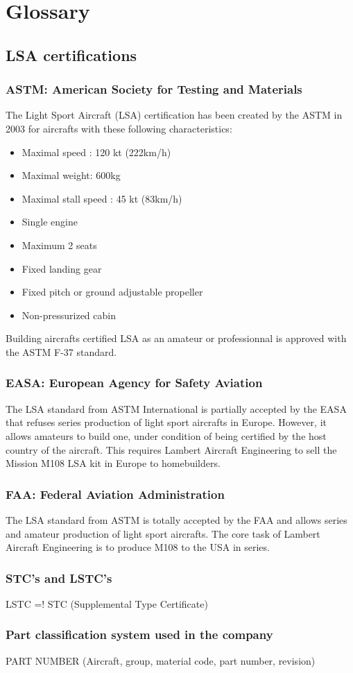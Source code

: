 \documentclass[11pt,a4paper]{article}
\begin{document}
\newpage

\section{Glossary} 
\subsection{LSA certifications}
\subsubsection{ASTM: American Society for Testing and Materials}
The Light Sport Aircraft (LSA) certification has been created by the ASTM in 2003 for aircrafts with these following characteristics:
\begin{itemize}
\item Maximal speed : 120 kt (222km/h)
\item Maximal weight: 600kg
\item Maximal stall speed : 45 kt (83km/h)
\item Single engine
\item Maximum 2 seats
\item Fixed landing gear
\item Fixed pitch or ground adjustable propeller
\item Non-pressurized cabin
\end{itemize}

\bigskip

Building aircrafts certified LSA as an amateur or professionnal is approved with the ASTM F-37 standard.

\subsubsection{EASA: European Agency for Safety Aviation}
The LSA standard from ASTM International is partially accepted by the EASA that refuses series production of light sport aircrafts in Europe. However, it allows amateurs to build one, under condition of being certified by the host country of the aircraft. This requires Lambert Aircraft Engineering to sell the Mission M108 LSA kit in Europe to homebuilders.

\subsubsection{FAA: Federal Aviation Administration}
The LSA standard from ASTM is totally accepted by the FAA and allows series and amateur production of light sport aircrafts. The core task of Lambert Aircraft Engineering is to produce M108 to the USA in series.

\subsubsection{STC's and LSTC's}
LSTC =! STC (Supplemental Type Certificate)

\subsubsection{Part classification system used in the company}
PART NUMBER (Aircraft, group, material code, part number, revision)
\end{document}
